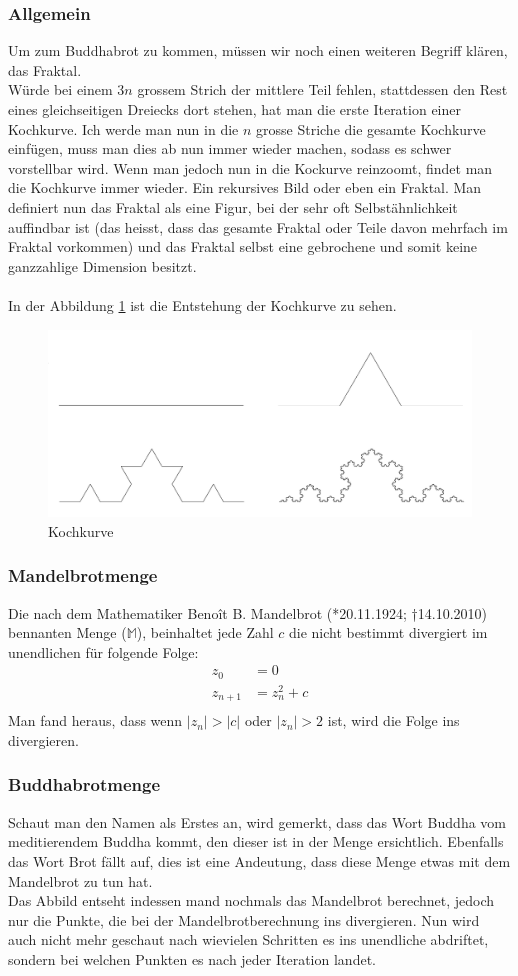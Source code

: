 \subsubsection{Allgemein}
Um zum Buddhabrot zu kommen, müssen wir noch einen weiteren Begriff klären, das Fraktal.\\ Würde bei einem 3$n$ grossem Strich der mittlere Teil fehlen, stattdessen den Rest eines gleichseitigen Dreiecks dort stehen, hat man die erste Iteration einer Kochkurve. Ich werde man nun in die $n$ grosse Striche die gesamte Kochkurve einfügen, muss man dies ab nun immer wieder machen, sodass es schwer vorstellbar wird. Wenn man jedoch nun in die Kockurve reinzoomt, findet man die Kochkurve immer wieder. Ein rekursives Bild oder eben ein Fraktal. Man definiert nun das Fraktal als eine Figur, bei der sehr oft Selbstähnlichkeit auffindbar ist (das heisst, dass das gesamte Fraktal oder Teile davon mehrfach im Fraktal vorkommen) und das Fraktal selbst eine gebrochene und somit keine ganzzahlige Dimension besitzt.\\
\\
In der Abbildung \ref{fig:Kochkurve} ist die Entstehung der Kochkurve zu sehen.

\begin{figure}[h]
    \centering
    \includegraphics[width=.5\textwidth]{Pictures/Kochkurve.png}
    \caption{Kochkurve}
    \label{fig:Kochkurve}
\end{figure}

\subsubsection{Mandelbrotmenge}
Die nach dem Mathematiker Benoît B. Mandelbrot (*20.11.1924; †14.10.2010) bennanten Menge ($\mathbb{M}$), beinhaltet jede Zahl $c$ die nicht bestimmt divergiert im unendlichen für folgende Folge:
\begin{align*}
z_0&=0\\
z_{n+1}&=z^2_n+c\\
\end{align*}
Man fand heraus, dass wenn $|z_n|>|c|$ oder $|z_n|>2$ ist, wird die Folge ins \inf divergieren. 
\subsubsection{Buddhabrotmenge}
Schaut man den Namen als Erstes an, wird gemerkt, dass das Wort Buddha vom meditierendem Buddha kommt, den dieser ist in der Menge ersichtlich. Ebenfalls das Wort Brot fällt auf, dies ist eine Andeutung, dass diese Menge etwas mit dem Mandelbrot zu tun hat. \\ Das Abbild entseht indessen mand nochmals das Mandelbrot berechnet, jedoch nur die Punkte, die bei der Mandelbrotberechnung ins \infty divergieren. Nun wird auch nicht mehr geschaut nach wievielen Schritten es ins unendliche abdriftet, sondern bei welchen Punkten es nach jeder Iteration landet. 